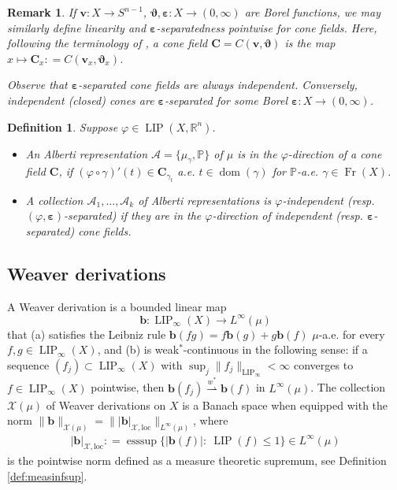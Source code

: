 \documentclass{amsart}
\newtheorem{definition}[theorem]{Definition}
\newtheorem{remark}[theorem]{Remark}
\numberwithin{equation}{section}
\newcommand{\R}{\mathbb{R}}
\renewcommand{\P}{\mathbb{P}}
\newcommand{\esssup}{\operatorname{esssup}}
\newcommand{\LIP}{\operatorname{LIP}}
\newcommand{\dom}{\operatorname{dom}}
\newcommand{\Fr}{\operatorname{Fr}}
\newcommand{\defl}{\mathrel{\mathop:}=}
\newcommand{\loc}{\mathrm{loc}}
\begin{document}
\begin{remark}\label{rmk:indep-vs-sep+conefields}
If $\bm v:X\to S^{n-1}$, $\bm\vartheta,\bm\varepsilon :X\to (0,\infty)$ are Borel functions, we may similarly define linearity and $\bm\varepsilon$-separatedness pointwise for \emph{cone fields}. Here, following the terminology of \cite{sch16b}, a cone field $\bm C=C(\bm v,\bm \vartheta)$ is the map $x\mapsto \bm C_x\defl C(\bm v_x,\bm\vartheta_x)$.

Observe that $\bm\varepsilon$-separated cone fields are always independent. Conversely, independent (closed) cones are $\bm\varepsilon$-separated for some Borel $\bm\varepsilon:X\to (0,\infty)$.
\end{remark}

\begin{definition}\label{def:indep-alb-rep}
Suppose $\varphi\in \LIP(X,\R^n)$. 

\begin{itemize}
	\item[(a)] An Alberti representation $\mathcal A=\{\mu_\gamma,\P\}$ of $\mu$ is in the $\varphi$-direction of a cone field $\bm C$, if $(\varphi\circ\gamma)'(t)\in \bm C_{\gamma_t}$ a.e. $t\in \dom(\gamma)$ for $\P$-a.e. $\gamma\in\Fr(X)$.
	\item[(b)] A collection $\mathcal A_1,\ldots, \mathcal A_k$ of Alberti representations is $\varphi$-independent (resp. $(\varphi,\bm\varepsilon)$-separated) if 
	they are in the $\varphi$-direction of independent (resp. $\bm\varepsilon$-separated) cone fields.
\end{itemize}
\end{definition}
 
\subsection{Weaver derivations}\label{sec:weaver-der}
A Weaver derivation is a bounded linear map 
\[
\bm b:\LIP_{\infty}(X)\to L^\infty(\mu)
\]
that (a) satisfies the Leibniz rule $\bm b(fg)=f\bm b(g)+g\bm b(f)$ $\mu$-a.e. for every $f,g\in \LIP_{\infty}(X)$,
and (b) is weak$^*$-continuous in the following sense: if a sequence $(f_j)\subset \LIP_{\infty}(X)$ 
with $\sup_j\|f_j\|_{\LIP_\infty}<\infty$ converges to $f\in\LIP_{\infty}(X)$ pointwise, then $\bm b(f_j)\stackrel{w^*}{\rightharpoonup} \bm b(f)$ in $L^\infty(\mu)$. The collection $\mathcal X(\mu)$ of Weaver derivations on $X$ is a Banach space when equipped with the norm $\|\bm b\|_{\mathcal X(\mu)}=\||\bm b|_{\mathcal X,\loc}\|_{L^\infty(\mu)}$, where
\begin{align}\label{eq:loc-norm}
	|\bm b|_{\mathcal X,\loc}\defl \esssup\{ |\bm b(f)|:\ \LIP(f)\le 1\}\in L^\infty(\mu)
\end{align}
is the pointwise norm defined as a measure theoretic supremum, see Definition \ref{def:measinfsup}. 
\end{document}
